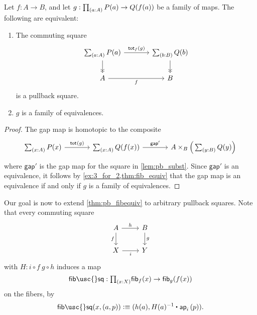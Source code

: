 \begin{thm}\label{thm:pb_fibequiv}
Let $f:A\to B$, and let $g:\prd{a:A}P(a)\to Q(f(a))$ be a family of maps. The following are equivalent:
\begin{enumerate}
\item The commuting square
\begin{equation*}
\begin{tikzcd}[column sep=large]
\sm{a:A}P(a) \arrow[r,"{\total[f]{g}}"] \arrow[d,->>] & \sm{b:B}Q(b) \arrow[d,->>] \\
A \arrow[r,swap,"f"] & B
\end{tikzcd}
\end{equation*}
is a pullback square.
\item $g$ is a family of equivalences.
\end{enumerate}
\end{thm}

\begin{proof}
The gap map is homotopic to the composite
\begin{equation*}
\begin{tikzcd}[column sep=large]
\sm{x:A}P(x) \arrow[r,"\total{g}"] & \sm{x:A}Q(f(x)) \arrow[r,"{\mathsf{gap}'}"] & A \times_B \Big(\sm{y:B}Q(y)\Big)
\end{tikzcd}
\end{equation*}
where $\mathsf{gap}'$ is the gap map for the square in \cref{lem:pb_subst}. Since $\mathsf{gap}'$ is an equivalence, it follows by \cref{ex:3_for_2,thm:fib_equiv} that the gap map is an equivalence if and only if $g$ is a family of equivalences.
\end{proof}

Our goal is now to extend \cref{thm:pb_fibequiv} to
arbitrary pullback squares. Note that every commuting
square
\begin{equation*}
\begin{tikzcd}
A \arrow[d,swap,"f"] \arrow[r,"h"] & B \arrow[d,"g"] \\
X \arrow[r,swap,"i"] & Y
\end{tikzcd}
\end{equation*}
with $H: i\circ f ~ g \circ h$ induces a map
\begin{equation*}
\mathsf{fib\usc{}sq} : \prd{x:X} \fib{f}{x} \to \fib{g}{f(x)}
\end{equation*}
on the fibers, by
\begin{equation*}
\mathsf{fib\usc{}sq}(x,(a,p))\defeq (h(a),\ct{H(a)^{-1}}{\ap{i}{p}}).
\end{equation*}

